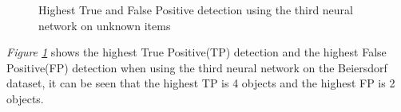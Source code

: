 \begin{figure}[h]
 \centering
 \hfill
 
 \caption{Highest True and False Positive detection using the third neural network on unknown items}
 \label{fig:v3max}
\end{figure}

\textit{Figure \ref{fig:v3max}} shows the highest True Positive(TP) detection and the highest False Positive(FP) detection when using the third neural network on the Beiersdorf dataset, it can be seen that the highest TP is 4 objects and the highest FP is 2 objects.

\clearpage
